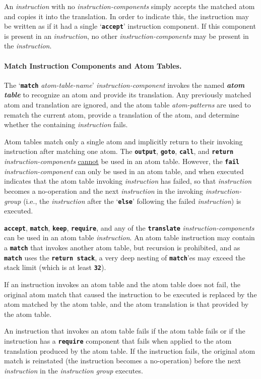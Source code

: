\documentclass[12pt]{article}
\makeatletter
\newcommand{\subsubsubsection}[1]{\paragraph[#1]{#1.}}
\newcommand{\TT}[1]{{\tt \bfseries #1}}
\newcommand{\key}[1]{{\bf \em #1}\index{#1}}
\newcommand{\ttmkey}[2]{\TT{#1}\index{#1@{\tt #1}!#2}}
\makeatother
\begin{document}
An {\em instruction} with no {\em instruction-components} simply accepts
the matched atom and copies it into the translation.  In order to
indicate this, the instruction may be written as if it had a single
`\TT{accept}' instruction component.  If this component is present
in an {\em instruction}, no other {\em instruction-components}
may be present in the {\em instruction}.

\subsubsubsection{Match Instruction Components and Atom Tables}

The `\ttmkey{match}{in lexical program} {\em atom-table-name}'
{\em instruction-component} invokes the named
\key{atom table}\label{ATOM-TABLE}
to recognize an atom and provide its translation.
Any previously matched atom and translation are ignored, and
the atom table {\em atom-patterns} are used to rematch the current atom,
provide a translation of the atom, and determine
whether the containing {\em instruction} fails.

Atom tables match only a single atom and implicitly return
to their invoking instruction after matching one atom.  The
\TT{output}, \TT{goto}, \TT{call}, and \TT{return}
{\em instruction-components} \underline{cannot} be used in an
atom table.  However, the \TT{fail} {\em instruction-component}
can only be used in an atom table, and when executed indicates
that the atom table invoking {\em instruction} has failed, so that
{\em instruction} becomes a no-operation and the next
{\em instruction} in the invoking
{\em instruction-group} (i.e., the {\em instruction}
after the `\TT{else}' following the failed {\em instruction}) is
executed.

\TT{accept}, \TT{match}, \TT{keep}, \TT{require}, and
any of the \TT{translate} {\em instruction-components} can be used in
an atom table {\em instruction}.  An atom table
instruction may contain a \TT{match} that invokes another atom table,
but recursion is prohibited, and as \TT{match} uses the
\TT{return stack}, a very deep nesting of \TT{match}'es may
exceed the stack limit (which is at least \TT{32}).

If an instruction invokes an atom table and
the atom table does not fail,
the original atom match that caused the instruction
to be executed is replaced by the atom matched by the
atom table, and the atom translation is that provided by the atom table.

An instruction that invokes an atom table fails if the atom table
fails or if the instruction has a \TT{require} component that fails
when applied to the atom translation produced by the atom table.
If the instruction fails, the
original atom match is reinstated (the instruction becomes a
no-operation) before the next {\em instruction} in the {\em instruction group}
executes.
\end{document}
